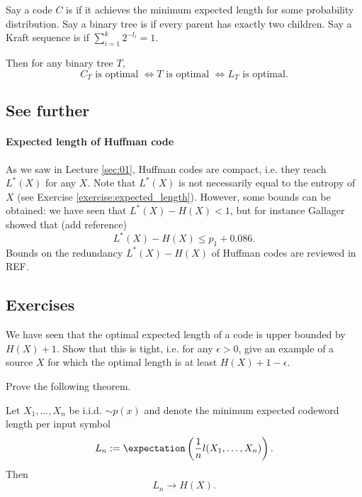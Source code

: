 \documentclass[a4paper, 11pt, openany]{book}
\begin{document}
Say a code $C$ is  if it achieves the minimum expected length for some probability distribution. Say a binary tree is  if every parent has exactly two children. Say a Kraft sequence is  if $\sum_{i=1}^k 2^{-l_i} = 1$.

Then for any binary tree $T$,
\[
	C_T \text{ is optimal } \iff T \text{ is optimal } \iff  L_T \text{ is optimal}.
\]


\subsection{See further}

\paragraph{Expected length of Huffman code} As we saw in Lecture \ref{sec:01}, Huffman codes are compact, i.e. they reach $L^*(X)$ for any $X$. Note that $L^*(X)$ is not necessarily equal to the entropy of $X$ (see Exercise \ref{exercise:expected_length}). However, some bounds can be obtained: we have seen that $L^*(X) - H(X) < 1$, but for instance Gallager showed that (add reference)
\[
    L^*(X) - H(X) \le p_1 + 0.086.
\]
Bounds on the redundancy $L^*(X) - H(X)$ of Huffman codes are reviewed in REF.

\subsection{Exercises}


\begin{exercise} \label{exercise:expected_length}
We have seen that the optimal expected length of a code is upper bounded by $H(X) + 1$. Show that this is tight, i.e. for any $\epsilon > 0$, give an example of a source $X$ for which the optimal length is at least $H(X) + 1 - \epsilon$.
\end{exercise}



\begin{exercise}
Prove the following theorem.

\begin{theorem}\label{th:source_coding}
Let $X_1,\ldots,X_n$ be i.i.d. $\sim p(x)$ and denote the minimum expected codeword length per input symbol
$$
	L_n := \expectation \left( \frac{1}{n} l(X_1,\ldots,X_n) \right).
$$
Then
$$
	L_n \to H(X).
$$
\end{theorem}

\end{exercise}
\end{document}
